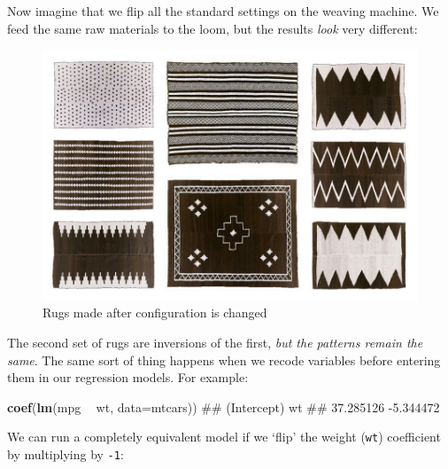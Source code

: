 \documentclass[]{article}
\newenvironment{Shaded}{\begin{snugshade}}{\end{snugshade}}
\newcommand{\KeywordTok}[1]{\textcolor[rgb]{0.13,0.29,0.53}{\textbf{#1}}}
\newcommand{\DataTypeTok}[1]{\textcolor[rgb]{0.13,0.29,0.53}{#1}}
\newcommand{\DecValTok}[1]{\textcolor[rgb]{0.00,0.00,0.81}{#1}}
\newcommand{\StringTok}[1]{\textcolor[rgb]{0.31,0.60,0.02}{#1}}
\newcommand{\OperatorTok}[1]{\textcolor[rgb]{0.81,0.36,0.00}{\textbf{#1}}}
\newcommand{\NormalTok}[1]{#1}
\theoremstyle{definition}
\theoremstyle{definition}
\theoremstyle{definition}
\theoremstyle{remark}
\begin{document}
Now imagine that we flip all the standard settings on the weaving
machine. We feed the same raw materials to the loom, but the results
\emph{look} very different:

\begin{figure}
\centering
\includegraphics{media/rugs2.jpg}
\caption{Rugs made after configuration is changed}
\end{figure}

The second set of rugs are inversions of the first, \emph{but the
patterns remain the same}. The same sort of thing happens when we recode
variables before entering them in our regression models. For example:

\begin{Shaded}
\begin{Highlighting}[]
\KeywordTok{coef}\NormalTok{(}\KeywordTok{lm}\NormalTok{(mpg }\OperatorTok{~}\StringTok{ }\NormalTok{wt, }\DataTypeTok{data=}\NormalTok{mtcars))}
\NormalTok{## (Intercept)          wt }
\NormalTok{##   37.285126   -5.344472}
\end{Highlighting}
\end{Shaded}

We can run a completely equivalent model if we `flip' the weight
(\texttt{wt}) coefficient by multiplying by \texttt{-1}:

\begin{Shaded}
\end{Shaded}
\end{document}
